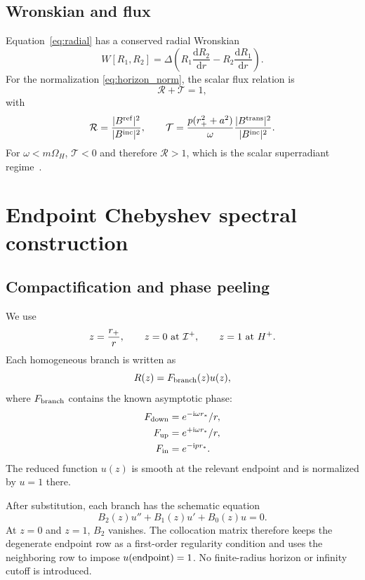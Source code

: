 \documentclass[aps,prd,twocolumn,nofootinbib,superscriptaddress,10pt]{revtex4-2}
\newcommand{\ii}{\mathrm{i}}
\newcommand{\dd}{\mathrm{d}}
\newcommand{\rp}{r_+}
\newcommand{\OmH}{\Omega_H}
\newcommand{\Bin}{B^{\rm inc}}
\newcommand{\Bref}{B^{\rm ref}}
\newcommand{\Btrans}{B^{\rm trans}}
\begin{document}
\subsection{Wronskian and flux}

Equation~\eqref{eq:radial} has a conserved radial Wronskian
\begin{equation}
W[R_1,R_2]=\Delta\left(R_1\frac{\dd R_2}{\dd r}
-R_2\frac{\dd R_1}{\dd r}\right).
\end{equation}
For the normalization \eqref{eq:horizon_norm}, the scalar flux relation is
\begin{equation}
\mathcal R+\mathcal T=1,
\end{equation}
with
\begin{equation}
\mathcal R=\frac{|\Bref|^2}{|\Bin|^2},\qquad
\mathcal T=
\frac{p(\rp^2+a^2)}{\omega}
\frac{|\Btrans|^2}{|\Bin|^2}.
\label{eq:flux}
\end{equation}
For $\omega<m\OmH$, $\mathcal T<0$ and therefore $\mathcal R>1$, which is the
scalar superradiant regime~\cite{PressTeukolsky1972}.

\section{Endpoint Chebyshev spectral construction}
\label{sec:spectral}

\subsection{Compactification and phase peeling}

We use
\begin{equation}
z=\frac{\rp}{r},\qquad z=0\ {\rm at}\ \mathcal{I}^+,\qquad z=1\ {\rm at}\ H^+ .
\end{equation}
Each homogeneous branch is written as
\begin{equation}
R(z)=F_{\rm branch}(z)u(z),
\end{equation}
where $F_{\rm branch}$ contains the known asymptotic phase:
\begin{align}
F_{\rm down} &= e^{-\ii\omega r_*}/r,\\
F_{\rm up} &= e^{+\ii\omega r_*}/r,\\
F_{\rm in} &= e^{-\ii p r_*}.
\end{align}
The reduced function $u(z)$ is smooth at the relevant endpoint and is
normalized by $u=1$ there.

After substitution, each branch has the schematic equation
\begin{equation}
B_2(z)u''+B_1(z)u'+B_0(z)u=0.
\label{eq:peeled}
\end{equation}
At $z=0$ and $z=1$, $B_2$ vanishes.  The collocation matrix therefore keeps the
degenerate endpoint row as a first-order regularity condition and uses the
neighboring row to impose $u({\rm endpoint})=1$.  No finite-radius horizon or
infinity cutoff is introduced.
\end{document}
